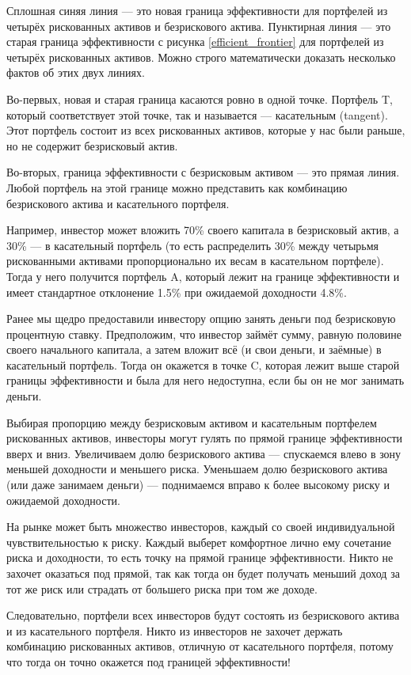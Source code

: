 Сплошная синяя линия --- это новая граница эффективности для портфелей из четырёх рискованных активов и безрискового актива. Пунктирная линия --- это старая граница эффективности с рисунка \ref{efficient_frontier} для портфелей из четырёх рискованных активов. Можно строго математически доказать несколько фактов об этих двух линиях.

Во-первых, новая и старая граница касаются ровно в одной точке. Портфель T, который соответствует этой точке, так и называется --- касательным (tangent). Этот портфель состоит из всех рискованных активов, которые у нас были раньше, но не содержит безрисковый актив.

Во-вторых, граница эффективности с безрисковым активом --- это прямая линия. Любой портфель на этой границе можно представить как комбинацию безрискового актива и касательного портфеля.

Например, инвестор может вложить 70\% своего капитала в безрисковый актив, а 30\% --- в касательный портфель (то есть распределить 30\% между четырьмя рискованными активами пропорционально их весам в касательном портфеле). Тогда у него получится портфель A, который лежит на границе эффективности и имеет стандартное отклонение 1.5\% при ожидаемой доходности 4.8\%.

Ранее мы щедро предоставили инвестору опцию занять деньги под безрисковую процентную ставку. Предположим, что инвестор займёт сумму, равную половине своего начального капитала, а затем вложит всё (и свои деньги, и заёмные) в касательный портфель. Тогда он окажется в точке C, которая лежит выше старой границы эффективности и была для него недоступна, если бы он не мог занимать деньги.

Выбирая пропорцию между безрисковым активом и касательным портфелем рискованных активов, инвесторы могут гулять по прямой границе эффективности вверх и вниз. Увеличиваем долю безрискового актива --- спускаемся влево в зону меньшей доходности и меньшего риска. Уменьшаем долю безрискового актива (или даже занимаем деньги) --- поднимаемся вправо к более высокому риску и ожидаемой доходности. 

На рынке может быть множество инвесторов, каждый со своей индивидуальной чувствительностью к риску. Каждый выберет комфортное лично ему сочетание риска и доходности, то есть точку на прямой границе эффективности. Никто не захочет оказаться под прямой, так как тогда он будет получать меньший доход за тот же риск или страдать от большего риска при том же доходе.

Следовательно, портфели всех инвесторов будут состоять из безрискового актива и из касательного портфеля. Никто из инвесторов не захочет держать комбинацию рискованных активов, отличную от касательного портфеля, потому что тогда он точно окажется под границей эффективности!

